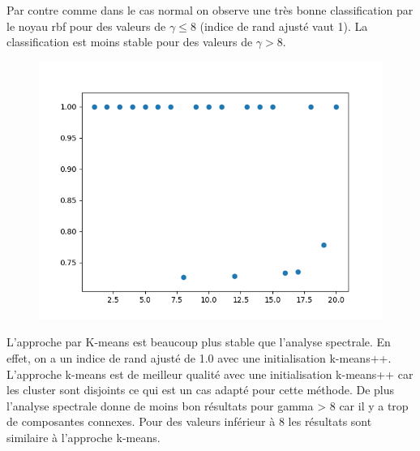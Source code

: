 \documentclass[12pt]{scrartcl} %
\begin{document}
\newline 
Par contre comme dans le cas normal on observe une très bonne classification par le noyau rbf pour des valeurs de $\gamma\leq 8$ (indice de rand ajusté vaut 1). La classification est moins stable pour des valeurs de $\gamma >8$. 
\newline
\begin{figure}[!h]
 \centering 
\includegraphics[scale=.3]{spectralUnifRBF.png}
\end{figure}
\newline 
L'approche par K-means est beaucoup plus stable que l'analyse spectrale. En effet, on a un indice de rand ajusté de 1.0 avec une initialisation k-means++. L'approche k-means est de meilleur qualité avec une initialisation k-means++ car les cluster sont disjoints ce qui est un cas adapté pour cette méthode. De plus l'analyse spectrale donne de moins bon résultats pour gamma > 8 car il y a trop de composantes connexes. Pour des valeurs inférieur à 8 les résultats sont similaire à l'approche k-means.
\end{document}
